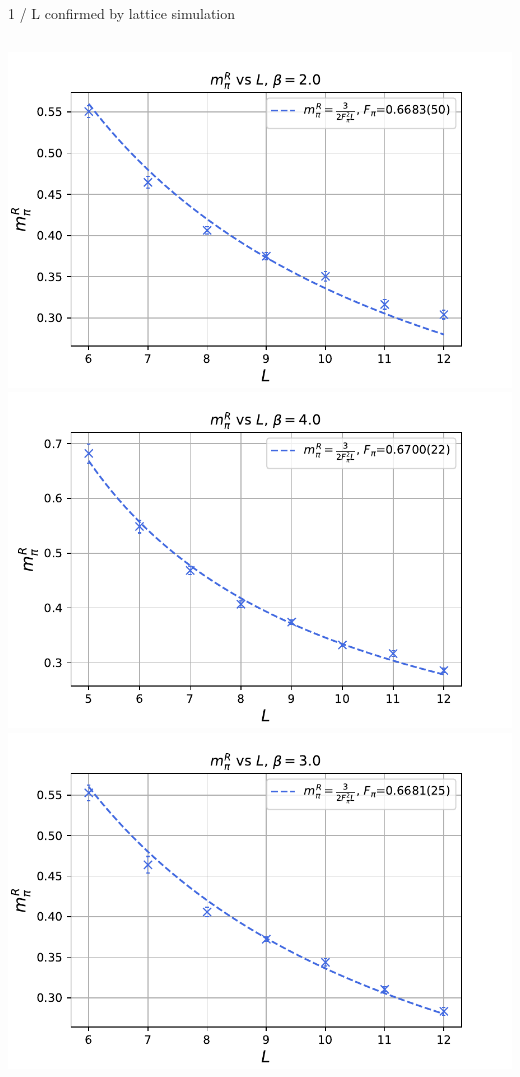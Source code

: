 \documentclass[english]{beamer}
\begin{document}
\begin{frame}{1 / L confirmed by lattice simulation}
  \begin{columns}[t]
      \includegraphics[width=1.0\textwidth]{figs/ResMpiBeta2}
      \includegraphics[width=1.0\textwidth]{figs/ResMpiBeta4}
      \includegraphics[width=1.0\textwidth]{figs/ResMpiBeta3}

\end{columns}
\end{frame}
\end{document}
